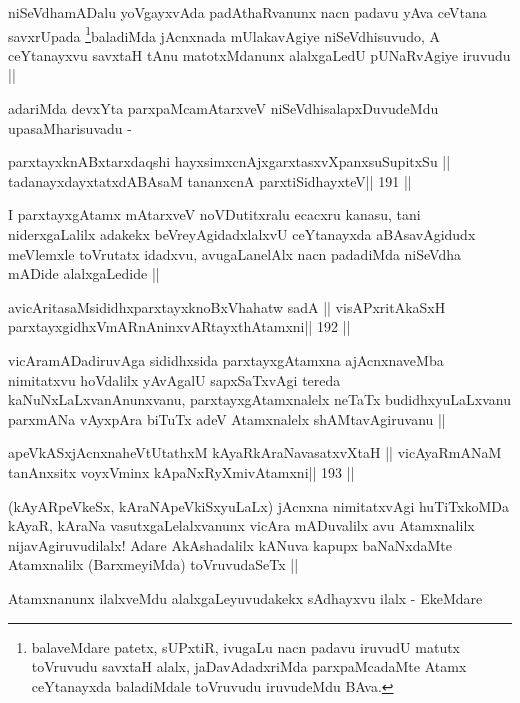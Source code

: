 \begin{artha}
niSeVdhamADalu yoVgayxvAda padAthaRvanunx nacn padavu yAva ceVtana
savxrUpada  \footnote[1]{balaveMdare patetx, sUPxtiR, ivugaLu nacn
  padavu iruvudU matutx toVruvudu savxtaH alalx, jaDavAdadxriMda
  parxpaMcadaMte Atamx ceYtanayxda baladiMdale toVruvudu iruvudeMdu BAva.}baladiMda jAcnxnada mUlakavAgiye
niSeVdhisuvudo, A ceYtanayxvu savxtaH tAnu matotxMdanunx alalxgaLedU
pUNaRvAgiye iruvudu ||

adariMda devxYta parxpaMcamAtarxveV niSeVdhisalapxDuvudeMdu
upasaMharisuvadu -
\end{artha}

\begin{shl}
parxtayxknABxtarxdaqshi hayxsimxcnAjxgarxtasxvXpanxsuSupitxSu ||
tadanayxdayxtatxdABAsaM tananxcnA parxtiSidhayxteV\hfill || 191 ||
\end{shl}

\begin{artha}
I parxtayxgAtamx mAtarxveV noVDutitxralu ecacxru kanasu, tani
niderxgaLalilx adakekx beVreyAgidadxlalxvU ceYtanayxda aBAsavAgidudx
meVlemxle toVrutatx idadxvu, avugaLanelAlx nacn padadiMda niSeVdha
mADide alalxgaLedide ||
\end{artha}

\begin{shl}
avicAritasaMsididhxparxtayxknoBxVhahatw sadA ||
visAPxritAkaSxH parxtayxgidhxVmARnAninxvARtayxthA\s\s tamxni\hfill || 192 ||
\end{shl}

\begin{artha}
vicAramADadiruvAga sididhxsida parxtayxgAtamxna ajAcnxnaveMba
nimitatxvu hoVdalilx yAvAgalU sapxSaTxvAgi tereda
kaNuNxLaLxvanAnunxvanu, parxtayxgAtamxnalelx neTaTx budidhxyuLaLxvanu
parxmANa vAyxpAra biTuTx adeV Atamxnalelx shAMtavAgiruvanu ||
\end{artha}

\begin{shl}
apeVkASxjAcnxnaheVtUtathxM kAyaRkAraNavasatxvXtaH ||
vicAyaRmANaM tanAnxsitx voyxVminx kApaNxRyXmivA\s\s tamxni\hfill || 193 ||
\end{shl}

\begin{artha}
(kAyARpeVkeSx, kAraNApeVkiSxyuLaLx) jAcnxna nimitatxvAgi huTiTxkoMDa
  kAyaR, kAraNa vasutxgaLelalxvanunx vicAra mADuvalilx avu Atamxnalilx
  nijavAgiruvudilalx! Adare AkAshadalilx  kANuva kapupx baNaNxdaMte
  Atamxnalilx (BarxmeyiMda) toVruvudaSeTx ||

Atamxnanunx ilalxveMdu alalxgaLeyuvudakekx sAdhayxvu ilalx - EkeMdare
\end{artha}

